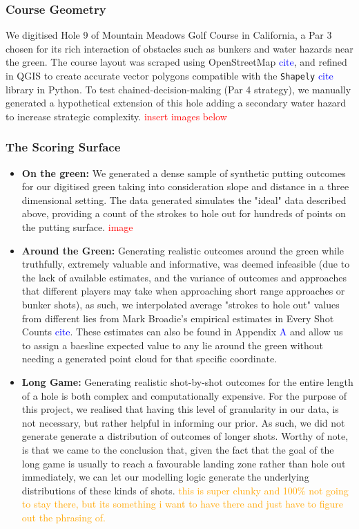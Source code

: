 \documentclass[11pt, letterpaper]{article}
\begin{document}
\subsubsection{Course Geometry}
We digitised Hole 9 of Mountain Meadows Golf Course in California, a Par 3 chosen for its rich interaction of obstacles such as bunkers and water hazards near the green. The course layout was scraped using OpenStreetMap \textcolor{blue}{cite}, and refined in QGIS to create accurate vector polygons compatible with the \texttt{Shapely} \textcolor{blue}{cite} library in Python. To test chained-decision-making (Par 4 strategy), we manually generated a hypothetical extension of this hole adding a secondary water hazard to increase strategic complexity. \textcolor{red}{insert images below}

\subsubsection{The Scoring Surface}
\begin{itemize}
    \item \textbf{On the green:} We generated a dense sample of synthetic putting outcomes for our digitised green taking into consideration slope and distance in a three dimensional setting. The data generated simulates the "ideal" data described above, providing a count of the strokes to hole out for hundreds of points on the putting surface. \textcolor{red}{image}
    \item \textbf{Around the Green:} Generating realistic outcomes around the green while truthfully, extremely valuable and informative, was deemed infeasible (due to the lack of available estimates, and the variance of outcomes and approaches that different players may take when approaching short range approaches or bunker shots), as such, we interpolated average "strokes to hole out" values from different lies from Mark Broadie's empirical estimates in Every Shot Counts \textcolor{blue}{cite}. These estimates can also be found in Appendix \textcolor{blue}{A} and allow us to assign a baesline expected value to any lie around the green without needing a generated point cloud for that specific coordinate.
    
    \item \textbf{Long Game:} Generating realistic shot-by-shot outcomes for the entire length of a hole is both complex and computationally expensive. For the purpose of this project, we realised that having this level of granularity in our data, is not necessary, but rather helpful in informing our prior. As such, we did not generate generate a distribution of outcomes of longer shots. Worthy of note, is that we came to the conclusion that, given the fact that the goal of the long game is usually to reach a favourable landing zone rather than hole out immediately, we can let our modelling logic generate the underlying distributions of these kinds of shots. \textcolor{orange}{ this is super clunky and 100\% not going to stay there, but its something i want to have there and just have to figure out the phrasing of.}
\end{itemize}
\end{document}
